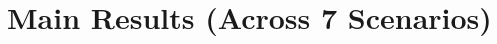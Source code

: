 \documentclass{article}
\begin{document}
\section*{Main Results (Across 7 Scenarios)}

\end{document}
